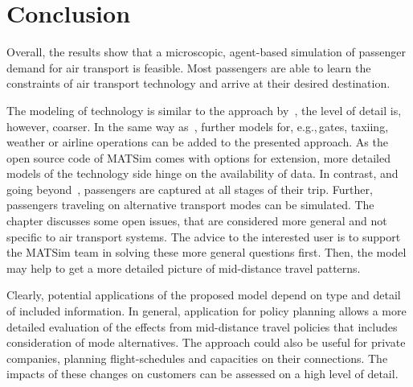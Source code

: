 \section{Conclusion}
Overall, the results show that a microscopic, agent-based simulation of passenger demand for air transport is feasible. 
Most passengers are able to learn the constraints of air transport technology and arrive at their desired destination.

The modeling of technology is similar to the approach by~\citet{ClarkeEtAl2007AirNetworkSim}, the level of detail is, however, coarser. 
In the same way as~\citet{ClarkeEtAl2007AirNetworkSim}, further models for, e.g.,\,gates, taxiing, weather or airline operations can be added to the presented approach. 
As the open source code of MATSim comes with options for extension, more detailed models of the technology side hinge on the availability of data. 
In contrast, and going beyond~\citet{ClarkeEtAl2007AirNetworkSim}, passengers are captured at all stages of their trip. 
Further, passengers traveling on alternative transport modes can be simulated. 
The chapter discusses some open issues, that are considered more general and not specific to air transport systems. 
The advice to the interested user is to support the MATSim team in solving these more general questions first.  
Then, the model may help to get a more detailed picture of mid-distance travel patterns.

Clearly, potential applications of the proposed model depend on type and detail of included information. 
In general, application for policy planning allows a more detailed evaluation of the effects from mid-distance travel policies that includes consideration of mode alternatives. 
The approach could also be useful for private companies, planning flight-schedules and capacities on their connections. 
The impacts of these changes on customers can be assessed on a high level of detail. 

